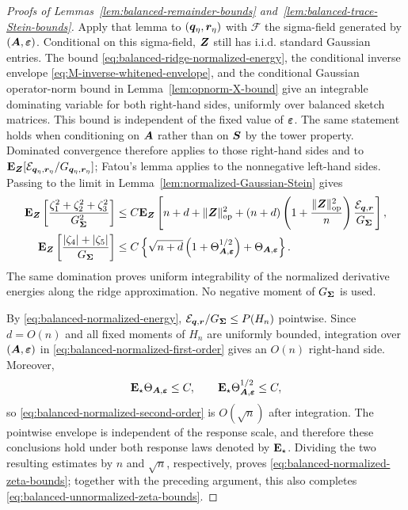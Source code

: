 \documentclass{article}
\theoremstyle{plain} %
\theoremstyle{definition} %
\theoremstyle{definition} %
\begin{document}
\begin{proof}[Proofs of Lemmas~\ref{lem:balanced-remainder-bounds}
and~\ref{lem:balanced-trace-Stein-bounds}]
Apply that lemma to $(\boldsymbol{q}_\eta,\boldsymbol{r}_\eta)$ with
$\mathcal F$ the sigma-field generated by $(\boldsymbol{A},{\boldsymbol{\varepsilon} })$.  Conditional on this
sigma-field, $\boldsymbol{Z}$ still has i.i.d. standard Gaussian entries.  The bound
\eqref{eq:balanced-ridge-normalized-energy},
the conditional inverse envelope
\eqref{eq:M-inverse-whitened-envelope}, and the conditional Gaussian
operator-norm bound in Lemma~\ref{lem:opnorm-X-bound} give an integrable
dominating variable for both right-hand sides, uniformly over balanced
sketch matrices. This bound is independent of the fixed value of
${\boldsymbol{\varepsilon} }$. The same statement holds when
conditioning on $\boldsymbol{A}$ rather than on $\boldsymbol{S}$ by the tower property.
Dominated convergence therefore applies to those right-hand sides and to
${\mathbf{E}}_{\boldsymbol{Z}}[{\mathcal E}_{\boldsymbol{q}_\eta,\boldsymbol{r}_\eta}/G_{\boldsymbol{q}_\eta,\boldsymbol{r}_\eta}]$;
Fatou's lemma applies to the nonnegative
left-hand sides. Passing to the limit in
Lemma~\ref{lem:normalized-Gaussian-Stein} gives
\begin{align}
    {\mathbf{E}}_{\boldsymbol{Z}}\left[
       \frac{\zeta_1^2+\zeta_2^2+\zeta_3^2}{G_{\boldsymbol{\Sigma}}^2}
    \right]
    &\leq C{\mathbf{E}}_{\boldsymbol{Z}}\left[
       n+d+\lVert\boldsymbol{Z}\rVert_{\rm op}^2
       +(n+d)\left(1+\frac{\lVert\boldsymbol{Z}\rVert_{\rm op}^2}{n}\right)
          \frac{{\mathcal E}_{\boldsymbol{q},\boldsymbol{r}}}{G_{\boldsymbol{\Sigma}}}
    \right],
    \label{eq:balanced-normalized-first-order}\\
    {\mathbf{E}}_{\boldsymbol{Z}}\left[
       \frac{|\zeta_4|+|\zeta_5|}{G_{\boldsymbol{\Sigma}}}
    \right]
    &\leq C\left\{
       \sqrt{n+d}\left(1+\Theta_{\boldsymbol{A},{\boldsymbol{\varepsilon} }}^{1/2}\right)
       +\Theta_{\boldsymbol{A},{\boldsymbol{\varepsilon} }}
    \right\}.
    \label{eq:balanced-normalized-second-order}
\end{align}
The same domination proves uniform integrability of the normalized derivative
energies along the ridge approximation.  No negative moment of
$G_{\boldsymbol{\Sigma}}$ is used.

By \eqref{eq:balanced-normalized-energy},
${\mathcal E}_{\boldsymbol{q},\boldsymbol{r}}/G_{\boldsymbol{\Sigma}}\leq P(H_n)$ pointwise.
Since $d=O(n)$ and all fixed
moments of $H_n$ are uniformly bounded, integration over $(\boldsymbol{A},{\boldsymbol{\varepsilon} })$ in
\eqref{eq:balanced-normalized-first-order} gives an $O(n)$ right-hand side.
Moreover,
\begin{align*}
    {\mathbf{E}}_\star\Theta_{\boldsymbol{A},{\boldsymbol{\varepsilon} }}\leq C,
    \qquad
    {\mathbf{E}}_\star\Theta_{\boldsymbol{A},{\boldsymbol{\varepsilon} }}^{1/2}\leq C,
\end{align*}
so \eqref{eq:balanced-normalized-second-order} is $O(\sqrt n)$ after
integration.  The pointwise envelope is independent of the response scale,
and therefore these conclusions hold under both response laws denoted by
${\mathbf{E}}_\star$.  Dividing the two resulting estimates by $n$ and $\sqrt n$,
respectively, proves \eqref{eq:balanced-normalized-zeta-bounds}; together with
the preceding argument, this also completes
\eqref{eq:balanced-unnormalized-zeta-bounds}.


\end{proof}
\end{document}
